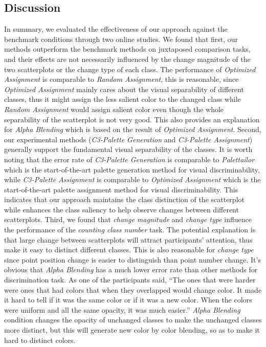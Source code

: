 \subsection{Discussion}
In summary, we evaluated the effectiveness of our approach against the benchmark conditions through two online studies.
We found that first, our methods outperform the benchmark methods on juxtaposed comparison tasks, and their effects are not necessarily influenced by the change magnitude of the two scatterplots or the change type of each class.
The performance of \emph{Optimized Assignment} is comparable to \emph{Random Assignment}, this is reasonable, since \emph{Optimized Assignment} mainly cares about the visual separability of different classes, thus it might assign the less salient color to the changed class while \emph{Random Assignment} would assign salient color even though the whole separability of the scatterplot is not very good. This also provides an explanation for \emph{Alpha Blending} which is based on the result of \emph{Optimized Assignment}.
Second, our experimental methods (\emph{C3-Palette Generation} and \emph{C3-Palette Assignment}) generally support the fundamental visual separability of the classes. It is worth noting that the error rate of \emph{C3-Palette Generation} is comparable to \emph{Palettailor} which is the start-of-the-art palette generation method for visual discriminability, while \emph{C3-Palette Assignment} is comparable to \emph{Optimized Assignment} which is the start-of-the-art palette assignment method for visual discriminability. This indicates that our approach maintains the class distinction of the scatterplot while enhances the class saliency to help observe changes between different scatterplots.
Third, we found that \emph{change magnitude} and \emph{change type} influence the performance of the \emph{counting class number} task. The potential explanation is that large change between scatterplots will attract participants' attention, thus make it easy to distinct different classes. This is also reasonable for \emph{change type} since point position change is easier to distinguish than point number change.
It's obvious that \emph{Alpha Blending} has a much lower error rate than other methods for discrimination task. As one of the participants said, ``The ones that were harder were ones that had colors that when they overlapped would change color. It made it hard to tell if it was the same color or if it was a new color. When the colors were uniform and all the same opacity, it was much easier.'' \emph{Alpha Blending} condition changes the opacity of unchanged classes to make the unchanged classes more distinct, but this will generate new color by color blending, so as to make it hard to distinct colors.

